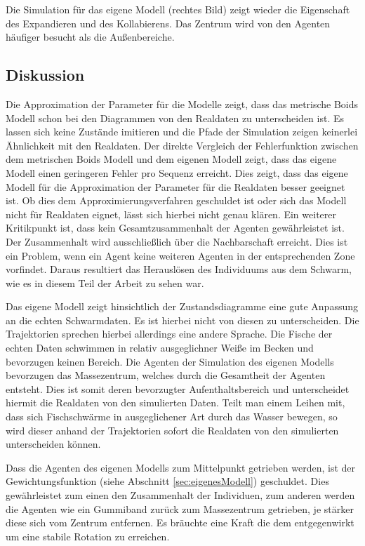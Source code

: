 Die Simulation für das eigene Modell (rechtes Bild) zeigt wieder die Eigenschaft des Expandieren und des Kollabierens.
Das Zentrum wird von den Agenten häufiger besucht als die Außenbereiche. 

\subsection{Diskussion}

Die Approximation der Parameter für die Modelle zeigt, dass das metrische Boids Modell schon bei den Diagrammen von den Realdaten zu unterscheiden ist. Es lassen sich keine Zustände imitieren und die Pfade der Simulation zeigen keinerlei Ähnlichkeit mit den Realdaten. Der direkte Vergleich der Fehlerfunktion zwischen dem metrischen Boids Modell und dem eigenen Modell zeigt, dass das eigene Modell einen geringeren Fehler pro Sequenz erreicht. Dies zeigt, dass das eigene Modell für die Approximation der Parameter für die Realdaten besser geeignet ist. Ob dies dem Approximierungsverfahren geschuldet ist oder sich das Modell nicht für Realdaten eignet, lässt sich hierbei nicht genau klären. Ein weiterer Kritikpunkt ist, dass kein Gesamtzusammenhalt der Agenten gewährleistet ist. Der Zusammenhalt wird ausschließlich über die Nachbarschaft erreicht. Dies ist ein Problem, wenn ein Agent keine weiteren Agenten in der entsprechenden Zone vorfindet. Daraus resultiert das Herauslösen des Individuums aus dem Schwarm, wie es in diesem Teil der Arbeit zu sehen war.

Das eigene Modell zeigt hinsichtlich der Zustandsdiagramme eine gute Anpassung an die echten Schwarmdaten. Es ist hierbei nicht von diesen zu unterscheiden. Die Trajektorien sprechen hierbei allerdings eine andere Sprache. Die Fische der echten Daten schwimmen in relativ ausgeglichner Weiße im Becken und bevorzugen keinen Bereich. Die Agenten der Simulation des eigenen Modells bevorzugen das Massezentrum, welches durch die Gesamtheit der Agenten entsteht. Dies ist somit deren bevorzugter Aufenthaltsbereich und unterscheidet hiermit die Realdaten von den simulierten Daten. Teilt man einem Leihen mit, dass sich Fischschwärme in ausgeglichener Art durch das Wasser bewegen, so wird dieser anhand der Trajektorien sofort die Realdaten von den simulierten unterscheiden können.

Dass die Agenten des eigenen Modells zum Mittelpunkt getrieben werden, ist der Gewichtungsfunktion (siehe Abschnitt \ref{sec:eigenesModell}) geschuldet. Dies gewährleistet zum einen den Zusammenhalt der Individuen, zum anderen werden die Agenten wie ein Gummiband zurück zum Massezentrum getrieben, je stärker diese sich vom Zentrum entfernen. Es bräuchte eine Kraft die dem entgegenwirkt um eine stabile Rotation zu erreichen.
